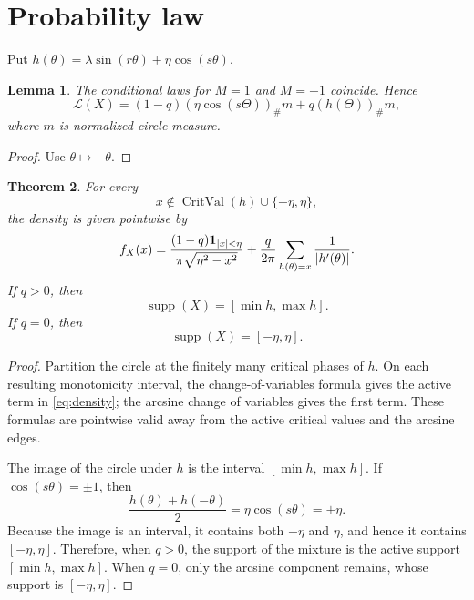 \documentclass[11pt]{amsart}
\numberwithin{equation}{section}\setcounter{tocdepth}{3}\setcounter{secnumdepth}{3}
\newtheorem{theorem}{Theorem}[section]\newtheorem{proposition}[theorem]{Proposition}
\newtheorem{lemma}[theorem]{Lemma}\newtheorem{corollary}[theorem]{Corollary}
\begin{document}
\section{Probability law}\label{sec:probability}
Put $h(\theta)=\lambda\sin(r\theta)+\eta\cos(s\theta)$.
\begin{lemma}\label{lem:mixture}
The conditional laws for $M=1$ and $M=-1$ coincide.  Hence
\begin{equation}\mathcal L(X)=(1-q)(\eta\cos(s\Theta))_\#m+q(h(\Theta))_\#m,\label{eq:two_mixture}\end{equation}
where $m$ is normalized circle measure.
\end{lemma}
\begin{proof}Use $\theta\mapsto-\theta$.\end{proof}
\begin{theorem}\label{thm:density}
For every
\begin{equation}
 x\notin \operatorname{CritVal}(h)\cup\{-\eta,\eta\},
 \label{eq:density_regular_set}
\end{equation}
the density is given pointwise by
\begin{equation}f_X(x)=\frac{(1-q){\bf1}_{|x|<\eta}}{\pi\sqrt{\eta^2-x^2}}
+\frac q{2\pi}\sum_{h(\theta)=x}\frac1{|h'(\theta)|}.\label{eq:density}\end{equation}
If $q>0$, then
\begin{equation}
 \operatorname{supp}(X)=[\min h,\max h].
 \label{eq:density_support_active}
\end{equation}
If $q=0$, then
\begin{equation}
 \operatorname{supp}(X)=[-\eta,\eta].
 \label{eq:density_support_inactive}
\end{equation}
\end{theorem}
\begin{proof}
Partition the circle at the finitely many critical phases of $h$.  On each resulting
monotonicity interval, the change-of-variables formula gives the active term in
\eqref{eq:density}; the arcsine change of variables gives the first term.  These formulas
are pointwise valid away from the active critical values and the arcsine edges.

The image of the circle under $h$ is the interval $[\min h,\max h]$.  If
$\cos(s\theta)=\pm1$, then
\begin{equation}
 \frac{h(\theta)+h(-\theta)}2=\eta\cos(s\theta)=\pm\eta.
 \label{eq:active_support_contains_arcsine_edges}
\end{equation}
Because the image is an interval, it contains both $-\eta$ and $\eta$, and hence it
contains $[-\eta,\eta]$.  Therefore, when $q>0$, the support of the mixture is the active
support $[\min h,\max h]$.  When $q=0$, only the arcsine component remains, whose support
is $[-\eta,\eta]$.
\end{proof}
\end{document}
